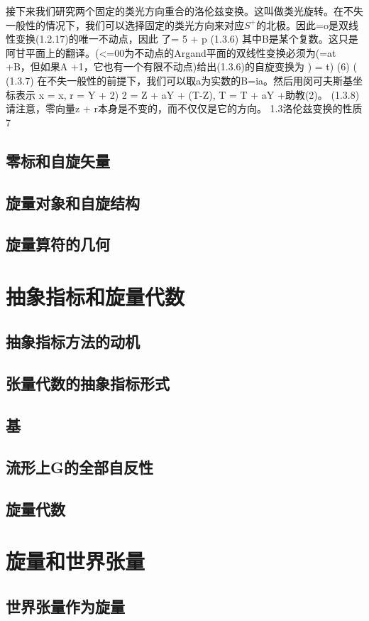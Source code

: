 \documentclass[utf8]{ctexbook}
\numberwithin{equation}{section}
\begin{document}
接下来我们研究两个固定的类光方向重合的洛伦兹变换。这叫做类光旋转。在不失一般性的情况下，我们可以选择固定的类光方向来对应$S^+$的北极。因此=o是双线性变换(1.2.17)的唯一不动点，因此
了= 5 + p
(1.3.6)
其中B是某个复数。这只是阿甘平面上的翻译。(<=00为不动点的Argand平面的双线性变换必须为(=at +B，但如果A +1，它也有一个有限不动点)给出(1.3.6)的自旋变换为
) = t) (6) (
(1.3.7)
在不失一般性的前提下，我们可以取a为实数的B=ia。然后用闵可夫斯基坐标表示
x = x, r = Y + 2)
2 = Z + aY + (T-Z), T = T + aY +助教(2)。
(1.3.8)
请注意，零向量z + r本身是不变的，而不仅仅是它的方向。
1.3洛伦兹变换的性质
7
\section{零标和自旋矢量}\label{sec:1.4}
\section{旋量对象和自旋结构}
\section{旋量算符的几何}
\chapter{抽象指标和旋量代数}
\section{抽象指标方法的动机}
\section{张量代数的抽象指标形式}
\section{基}
\section{流形上G的全部自反性}
\section{旋量代数}
\chapter{旋量和世界张量}
\section{世界张量作为旋量}
\end{document}
